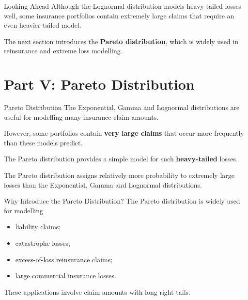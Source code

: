 \documentclass[
  ignorenonframetext,
  aspectratio=169,
]{beamer}
\providecommand{\tightlist}{%
  \setlength{\itemsep}{0pt}\setlength{\parskip}{0pt}}
\begin{document}
\begin{frame}{Looking Ahead}
\protect{}\label{looking-ahead-2}
Although the Lognormal distribution models heavy-tailed losses well,
some insurance portfolios contain extremely large claims that require an
even heavier-tailed model.

The next section introduces the \textbf{Pareto distribution}, which is
widely used in reinsurance and extreme loss modelling.
\end{frame}

\section{Part V: Pareto Distribution}\label{part-v-pareto-distribution}

\begin{frame}{Pareto Distribution}
\protect{}\label{pareto-distribution}
The Exponential, Gamma and Lognormal distributions are useful for
modelling many insurance claim amounts.

However, some portfolios contain \textbf{very large claims} that occur
more frequently than these models predict.

The Pareto distribution provides a simple model for such
\textbf{heavy-tailed} losses.

\begin{tcolorbox}[enhanced jigsaw, arc=.35mm, bottomrule=.15mm, bottomtitle=1mm, breakable, colback=white, colbacktitle=quarto-callout-note-color!10!white, colframe=quarto-callout-note-color-frame, coltitle=black, left=2mm, leftrule=.75mm, opacityback=0, opacitybacktitle=0.6, rightrule=.15mm, title=\textcolor{quarto-callout-note-color}{\faInfo}\hspace{0.5em}{Key Idea}, titlerule=0mm, toprule=.15mm, toptitle=1mm]

The Pareto distribution assigns relatively more probability to extremely
large losses than the Exponential, Gamma and Lognormal distributions.

\end{tcolorbox}
\end{frame}

\begin{frame}{Why Introduce the Pareto Distribution?}
\protect{}\label{why-introduce-the-pareto-distribution}
The Pareto distribution is widely used for modelling

\begin{itemize}
\tightlist
\item
  liability claims;
\item
  catastrophe losses;
\item
  excess-of-loss reinsurance claims;
\item
  large commercial insurance losses.
\end{itemize}

These applications involve claim amounts with long right tails.
\end{frame}
\end{document}
